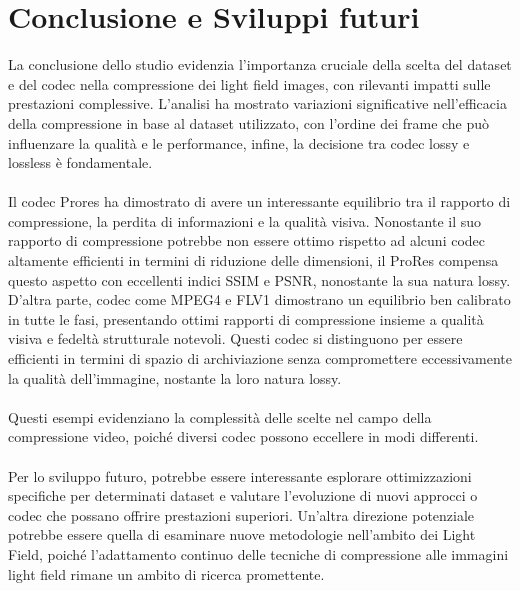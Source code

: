 \chapter{Conclusione e Sviluppi futuri}
La conclusione dello studio evidenzia l'importanza cruciale della scelta del dataset e del codec nella compressione dei light field images, con rilevanti impatti sulle prestazioni complessive. L'analisi ha mostrato variazioni significative nell'efficacia della compressione in base al dataset utilizzato, con l'ordine dei frame che può influenzare la qualità e le performance, infine, la decisione tra codec lossy e lossless è fondamentale.
\\
\\
Il codec Prores ha dimostrato di avere un interessante equilibrio tra il rapporto di compressione, la perdita di informazioni e la qualità visiva. Nonostante il suo rapporto di compressione potrebbe non essere ottimo rispetto ad alcuni codec altamente efficienti in termini di riduzione delle dimensioni, il ProRes compensa questo aspetto con eccellenti indici SSIM e PSNR, nonostante la sua natura lossy.
\\
D'altra parte, codec come MPEG4 e FLV1 dimostrano un equilibrio ben calibrato in tutte le fasi, presentando ottimi rapporti di compressione insieme a qualità visiva e fedeltà strutturale notevoli. Questi codec si distinguono per essere efficienti in termini di spazio di archiviazione senza compromettere eccessivamente la qualità dell'immagine, nostante la loro natura lossy.
\\
\\
Questi esempi evidenziano la complessità delle scelte nel campo della compressione video, poiché diversi codec possono eccellere in modi differenti.
\\
\\
Per lo sviluppo futuro, potrebbe essere interessante esplorare ottimizzazioni specifiche per determinati dataset e valutare l'evoluzione di nuovi approcci o codec che possano offrire prestazioni superiori. Un'altra direzione potenziale potrebbe essere quella di esaminare nuove metodologie nell'ambito dei Light Field, poiché l'adattamento continuo delle tecniche di compressione alle immagini light field rimane un ambito di ricerca promettente.
